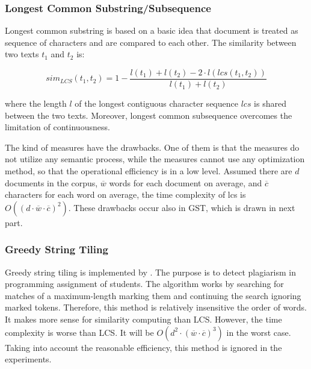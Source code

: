 \subsubsection{Longest Common Substring/Subsequence}

Longest common substring is based on a basic idea that document is treated as sequence of characters and are compared to each other. The similarity between two texts $t_1$ and $t_2$ is:

\begin{equation}
    sim_{LCS}(t_1, t_2) = 1 -  \frac{l(t_1) + l(t_2) - 2 \cdot l(lcs(t_1, t_2))}{l(t_1) + l(t_2)}
\end{equation}

where the length $l$ of the longest contiguous character sequence $lcs$ is shared between the two texts. Moreover, longest common subsequence overcomes the limitation of continuousness. 

The kind of measures have the drawbacks. One of them is that the measures do not utilize any semantic process, while the measures cannot use any optimization method, so that the operational efficiency is in a low level. Assumed there are $d$ documents in the corpus, $\overline{w}$ words for each document on average, and $\overline{c}$ characters for each word on average, the time complexity of lcs is $O((d \cdot \overline{w} \cdot \overline{c})^2)$. These drawbacks occur also in GST, which is drawn in next part. 

\subsubsection{Greedy String Tiling}

Greedy string tiling is implemented by \cite{wise1993string}. The purpose is to detect plagiarism in programming assignment of students. The algorithm works by searching for matches of a maximum-length marking them and continuing the search ignoring marked tokens. Therefore, this method is relatively insensitive the order of words. It makes more sense for similarity computing than LCS. However, the time complexity is worse than LCS. It will be  $O(d^2 \cdot (\overline{w} \cdot \overline{c})^3)$ in the worst case. Taking into account the reasonable efficiency, this method is ignored in the experiments.

\subsubsection{\cite{islam2008semantic}}


